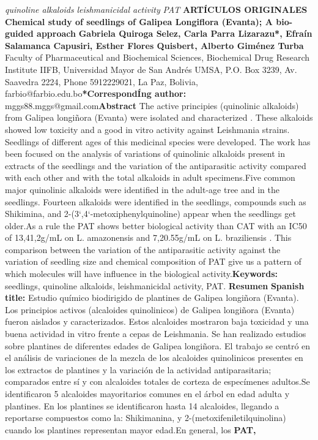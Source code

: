 \documentclass{article}
\begin{document}
\textit{quinoline alkaloids}
\textit{leishmanicidal activity}
\textit{PAT}
\textbf{ARTÍCULOS ORIGINALES}
\textbf{Chemical  study of seedlings of Galipea Longiflora (Evanta); A bio-guided approach}
\textbf{Gabriela Quiroga Selez, Carla Parra Lizarazu*, Efraín Salamanca Capusiri, Esther Flores Quisbert, Alberto Giménez Turba    }
Faculty of Pharmaceutical and Biochemical Sciences, Biochemical Drug Research Institute IIFB, Universidad Mayor de San Andrés UMSA, P.O. Box 3239, Av. Saavedra 2224, Phone 5912229021, La Paz, Bolivia, farbio@farbio.edu.bo\textbf{*CorrespondÍng author:}
mggs88.mggs@gmail.com\textbf{Abstract}
The active principies (quinolinic alkaloids) from Galipea longiñora (Evanta) were isolated and characterized . These alkaloids showed low toxicity and a good in vitro activity against Leishmania strains. Seedlings of different ages of this medicinal species were developed. The work has been focused on the analysis of variations of quinolinic alkaloids present in extracts of the seedlings and the variation of the antiparasitic activity compared with each other and with the total alkaloids in adult specimens.Five common major quinolinic alkaloids were identified in the adult-age tree and in the seedlings. Fourteen alkaloids were identified in the seedlings, compounds such as Shikimina, and 2-(3`,4`-metoxiphenylquinoline) appear when the seedlings get older.As a rule the PAT shows better biological activity than CAT with an IC50 of 13,41,2g/mL on L. amazonensis and 7,20.55g/mL on L. braziliensis . This comparison between the variation of the antiparasitic activity against the variation of seedling size and chemical composition of PAT give us a pattern of which molecules will have influence in the biological activity.\textbf{Keywords: }
seedlings, quinoline alkaloids, leishmanicidal activity, PAT. \textbf{Resumen}
\textbf{Spanish title: }
Estudio químico biodirigido de plantines de Galipea longiñora (Evanta). Los principios activos (alcaloides quinolinicos) de Galipea longiñora (Evanta) fueron aislados y caracterizados. Estos alcaloides mostraron baja toxicidad y una buena actividad in vitro frente a cepas de Leishmania. Se han realizado estudios sobre plantines de diferentes edades de Galipea longiñora. El trabajo se centró en el análisis de variaciones de la mezcla de los alcaloides quinolinicos presentes en los extractos de plantines y la variación de la actividad antiparasitaria; comparados entre sí y con alcaloides totales de corteza de especímenes adultos.Se identificaron 5 alcaloides mayoritarios comunes en el árbol en edad adulta y plantines. En los plantines se identificaron hasta 14 alcaloides, llegando a reportarse compuestos como la: Shikimanina, y 2-(metoxifeniletilquinolina) cuando los plantines representan mayor edad.En general, los \textbf{PAT, }
\end{document}
